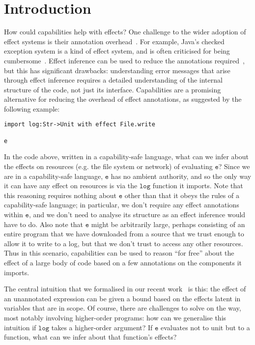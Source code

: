 \documentclass[sigplan,10pt,review]{acmart}\settopmatter{printfolios=true,printccs=false,printacmref=false}
\newcommand{\kwat}[1]{$\mathtt{#1}$}
\begin{document}
\section{Introduction}

How could capabilities help with effects?
One challenge to the wider adoption of effect systems is their annotation overhead~\cite{rytz12}.
For example, Java's checked exception system is a kind of effect system, and is often criticised for being cumbersome~\cite{Kiniry2006}.
Effect inference can be used to reduce the annotations required~\cite{koka14}, but this has significant drawbacks: understanding error messages that arise through effect inference requires a detailed understanding of the internal structure of the code, not just its interface.
Capabilities are a promising alternative for reducing the overhead of effect annotations, as suggested by the following example:

\begin{lstlisting}
import log:Str->Unit with effect File.write

e
\end{lstlisting}

In the code above, written in a capability-safe language, what can we infer about the effects on resources (e.g. the file system or network) of evaluating \kwat{e}?
Since we are in a capability-safe language, \kwat{e} has no ambient authority, and so the only way it can have any effect on resources is via the \kwat{log} function it imports.
Note that this reasoning requires nothing about \kwat{e} other than that it obeys the rules of a capability-safe language; in particular, we don't require any effect annotations within \kwat{e}, and we don't need to analyse its structure as an effect inference would have to do.
Also note that \kwat{e} might be arbitrarily large, perhaps consisting of an entire program that we have downloaded from a source that we trust enough to allow it to write to a log, but that we don't trust to access any other resources.
Thus in this scenario, capabilities can be used to reason ``for free'' about the effect of a large body of code based on a few annotations on the components it imports.

The central intuition that we formalised in our recent work~\cite{aaron-popl} is this: the effect of an unannotated expression can be given a bound based on the effects latent in variables that are in scope.
Of course, there are challenges to solve on the way, most notably involving higher-order programs: how can we generalise this intuition if \kwat{log} takes a higher-order argument?
If \kwat{e} evaluates not to unit but to a function, what can we infer about that function's effects?
\end{document}
